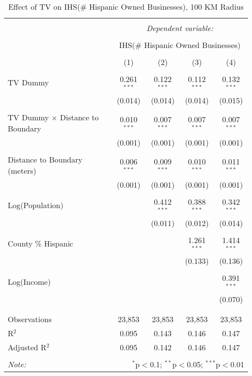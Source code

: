 
\begin{table}[!htbp] \centering 
  \caption{Effect of TV on IHS(\# Hispanic Owned Businesses), 100 KM Radius} 
  \label{} 
\begin{tabular}{@{\extracolsep{-5pt}}lcccc} 
\\[-1.8ex]\hline 
\hline \\[-1.8ex] 
 & \multicolumn{4}{c}{\textit{Dependent variable:}} \\ 
\cline{2-5} 
\\[-1.8ex] & \multicolumn{4}{c}{IHS(\# Hispanic Owned Businesses)} \\ 
\\[-1.8ex] & (1) & (2) & (3) & (4)\\ 
\hline \\[-1.8ex] 
 TV Dummy & 0.261$^{***}$ & 0.122$^{***}$ & 0.112$^{***}$ & 0.132$^{***}$ \\ 
  & (0.014) & (0.014) & (0.014) & (0.015) \\ 
  & & & & \\ 
 TV Dummy $\times$ Distance to Boundary & 0.010$^{***}$ & 0.007$^{***}$ & 0.007$^{***}$ & 0.007$^{***}$ \\ 
  & (0.001) & (0.001) & (0.001) & (0.001) \\ 
  & & & & \\ 
 Distance to Boundary (meters) & 0.006$^{***}$ & 0.009$^{***}$ & 0.010$^{***}$ & 0.011$^{***}$ \\ 
  & (0.001) & (0.001) & (0.001) & (0.001) \\ 
  & & & & \\ 
 Log(Population) &  & 0.412$^{***}$ & 0.388$^{***}$ & 0.342$^{***}$ \\ 
  &  & (0.011) & (0.012) & (0.014) \\ 
  & & & & \\ 
 County \% Hispanic &  &  & 1.261$^{***}$ & 1.414$^{***}$ \\ 
  &  &  & (0.133) & (0.136) \\ 
  & & & & \\ 
 Log(Income) &  &  &  & 0.391$^{***}$ \\ 
  &  &  &  & (0.070) \\ 
  & & & & \\ 
\hline \\[-1.8ex] 
Observations & 23,853 & 23,853 & 23,853 & 23,853 \\ 
R$^{2}$ & 0.095 & 0.143 & 0.146 & 0.147 \\ 
Adjusted R$^{2}$ & 0.095 & 0.142 & 0.146 & 0.147 \\ 
\hline 
\hline \\[-1.8ex] 
\textit{Note:}  & \multicolumn{4}{r}{$^{*}$p$<$0.1; $^{**}$p$<$0.05; $^{***}$p$<$0.01} \\ 
\end{tabular} 
\end{table} 
